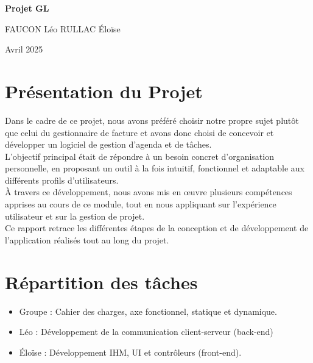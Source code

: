 \documentclass{article}
\begin{document}
\large

\begin{titlepage}
    \centering
    \vspace*{\fill} %
    {\Huge\bfseries Projet GL\par}
    {\Large FAUCON Léo RULLAC Éloïse\par}
    \vspace{0.5cm}
    {\Large Avril 2025\par}
    \vspace*{\fill} %
\end{titlepage}

\newpage

\renewcommand{\contentsname}{Sommaire}
{\large
\tableofcontents
}


\newpage

\section{Présentation du Projet}

\large Dans le cadre de ce projet, nous avons préféré choisir notre propre sujet plutôt que celui du gestionnaire de facture et avons donc choisi de concevoir et développer un logiciel de gestion d’agenda et de tâches.\\
L’objectif principal était de répondre à un besoin concret d’organisation personnelle, en proposant un outil à la fois intuitif, fonctionnel et adaptable aux différents profils d’utilisateurs.\\ 
À travers ce développement, nous avons mis en œuvre plusieurs compétences apprises au cours de ce module, tout en nous appliquant sur l’expérience utilisateur et sur la gestion de projet.\\
Ce rapport retrace les différentes étapes de la conception et de développement de l'application réalisés tout au long du projet.

\section{Répartition des tâches}
\begin{itemize}
    \item Groupe :  Cahier des charges, axe fonctionnel, statique et
 dynamique.
    \item Léo : Développement de la communication client-serveur (back-end)
    \item Éloïse :  Développement IHM, UI et contrôleurs (front-end).
\end{itemize} 
\end{document}
